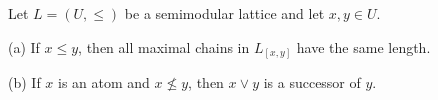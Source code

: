 Let $L = (U, \leq)$ be a semimodular lattice and let $x, y \in U$.

(a) If $x \leq y$, then all maximal chains in $L_{[x,y]}$ have the same length.

(b) If $x$ is an atom and $x \not\leq y$, then $x \vee y$ is a successor of $y$.
